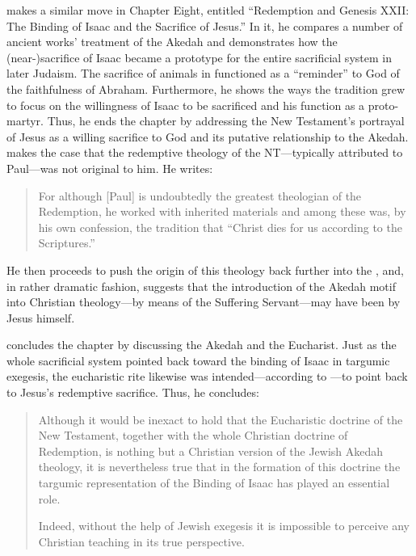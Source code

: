 \vermes makes a similar move in Chapter Eight, entitled ``Redemption and Genesis XXII: The Binding of Isaac and the Sacrifice of Jesus.'' In it, he compares a number of ancient works' treatment of the Akedah and demonstrates how the (near-)sacrifice of Isaac became a prototype for the entire sacrificial system in later Judaism. The sacrifice of animals in \thetemple functioned as a ``reminder'' to God of the faithfulness of Abraham. Furthermore, he shows the ways the tradition grew to focus on the willingness of Isaac to be sacrificed and his function as a proto-martyr. Thus, he ends the chapter by addressing the New Testament's portrayal of Jesus as a willing sacrifice to God and its putative relationship to the Akedah. \vermes makes the case that the redemptive theology of the NT---typically attributed to Paul---was not original to him. He writes: 

\begin{quote}
    For although [Paul] is undoubtedly the greatest theologian of the Redemption, he worked with inherited materials and among these was, by his own confession, the tradition that ``Christ dies for us according to the Scriptures.''%
    \autocite[221]{vermes1961}
\end{quote}
\noindent
He then proceeds to push the origin of this theology back further into the , and, in rather dramatic fashion, suggests that the introduction of the Akedah motif into Christian theology---by means of the Suffering Servant---may have been by Jesus himself.%
    \autocite[223]{vermes1961}

\vermes concludes the chapter by discussing the Akedah and the Eucharist. Just as the whole sacrificial system pointed back toward the binding of Isaac in targumic exegesis, the eucharistic rite likewise was intended---according to \vermes---to point back to Jesus's redemptive sacrifice. Thus, he concludes: 

\begin{quote}
    Although it would be inexact to hold that the Eucharistic doctrine of the New Testament, together with the whole Christian doctrine of Redemption, is nothing but a Christian version of the Jewish Akedah theology, it is nevertheless true that in the formation of this doctrine the targumic representation of the Binding of Isaac has played an essential role. 
    
    Indeed, without the help of Jewish exegesis it is impossible to perceive any Christian teaching in its true perspective.%
    \autocite[227]{vermes1961}
\end{quote} 

